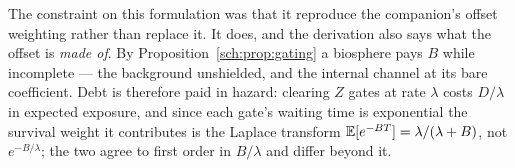 The constraint on this formulation was that it reproduce the companion's
offset weighting rather than replace it. It does, and the derivation
also says what the offset is \emph{made of}. By Proposition~\ref{sch:prop:gating} a biosphere pays $B$ while
incomplete --- the background unshielded, and the internal channel at its
bare coefficient. Debt is therefore paid in hazard: clearing $Z$ gates at
rate $\lambda$ costs $D/\lambda$ in expected exposure, and since each
gate's waiting time is exponential the survival weight it contributes
is the Laplace transform $\mathbb{E}[e^{-BT}]=\lambda/(\lambda+B)$,
not $e^{-B/\lambda}$; the two agree to first order in
$B/\lambda$ and differ beyond it.

